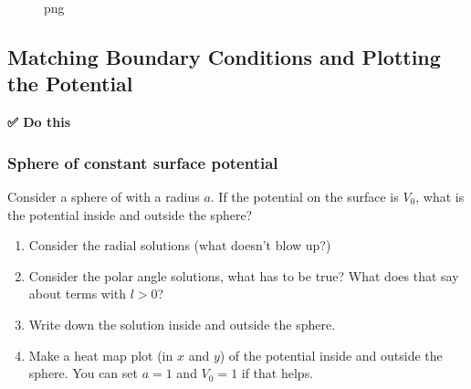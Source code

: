 \begin{figure}
\centering
{}
\caption{png}
\end{figure}

\subsection{Matching Boundary Conditions and Plotting the
Potential}\label{matching-boundary-conditions-and-plotting-the-potential}

\textbf{✅ Do this}

\subsubsection{Sphere of constant surface
potential}\label{sphere-of-constant-surface-potential}

Consider a sphere of with a radius \(a\). If the potential on the
surface is \(V_0\), what is the potential inside and outside the sphere?

\begin{enumerate}
\def\labelenumi{\arabic{enumi}.}
\tightlist
\item
  Consider the radial solutions (what doesn't blow up?)
\item
  Consider the polar angle solutions, what has to be true? What does
  that say about terms with \(l>0\)?
\item
  Write down the solution inside and outside the sphere.
\item
  Make a heat map plot (in \(x\) and \(y\)) of the potential inside and
  outside the sphere. You can set \(a=1\) and \(V_0=1\) if that helps.
\end{enumerate}

